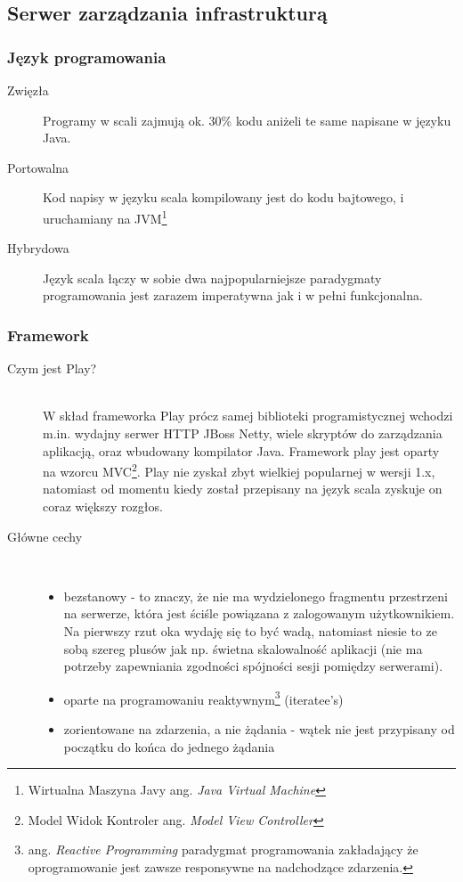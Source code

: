 \subsection{Serwer zarządzania infrastrukturą}

\subsubsection{Język programowania}
\begin{description}
	\item[Zwięzła] \hfill \par
		Programy w scali zajmują ok. 30\% kodu aniżeli te same napisane w języku Java.
	\item[Portowalna] \hfill \par
		Kod napisy w języku scala kompilowany jest do kodu bajtowego, i uruchamiany na JVM\footnote{Wirtualna Maszyna Javy ang. \emph{Java Virtual Machine}}
	\item[Hybrydowa] \hfill \par
		Język scala łączy w sobie dwa najpopularniejsze paradygmaty programowania jest zarazem imperatywna jak i w pełni funkcjonalna.
\end{description}

\subsubsection{Framework}

\begin{description}
	\item[Czym jest Play?]\hfill \\
		W skład frameworka Play prócz samej biblioteki programistycznej wchodzi m.in. wydajny serwer HTTP JBoss Netty, wiele skryptów do zarządzania aplikacją, oraz wbudowany kompilator Java. Framework play jest oparty na wzorcu MVC\footnote{Model Widok Kontroler ang. \emph{Model View Controller}}. Play nie zyskał zbyt wielkiej popularnej w wersji 1.x, natomiast od momentu kiedy został przepisany na język scala zyskuje on coraz większy rozgłos.
	\item[Główne cechy]\hfill \\
		\begin{itemize}
			\item bezstanowy - to znaczy, że nie ma wydzielonego fragmentu przestrzeni na serwerze, która jest ściśle powiązana z zalogowanym użytkownikiem. Na pierwszy rzut oka wydaję się to być wadą, natomiast niesie to ze sobą szereg plusów jak np. świetna skalowalność aplikacji (nie ma potrzeby zapewniania zgodności spójności sesji pomiędzy serwerami).
			\item oparte na programowaniu reaktywnym\footnote{ang. \emph{Reactive Programming} paradygmat programowania zakładający że oprogramowanie jest zawsze responsywne na nadchodzące zdarzenia.}
 (iteratee's) 		
		\item zorientowane na zdarzenia, a nie żądania - wątek nie jest przypisany od początku do końca do jednego żądania
		\end{itemize}
\end{description}



